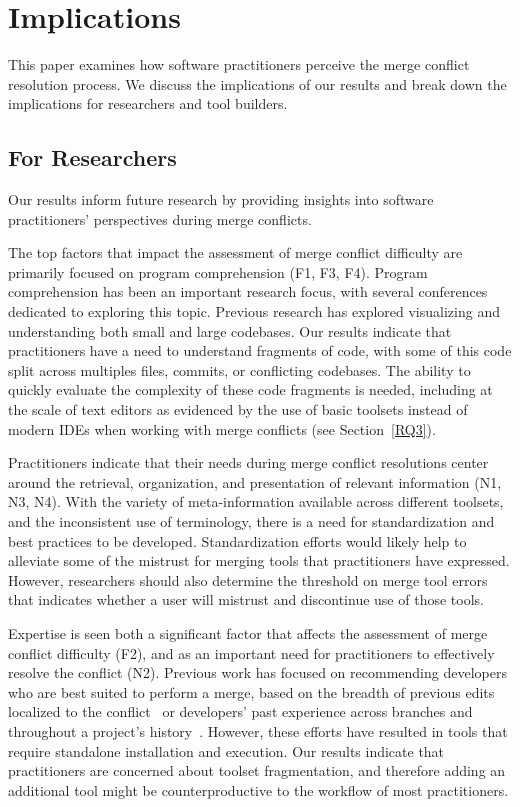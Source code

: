 \section{Implications}\label{implications}
This paper examines how software practitioners perceive the merge conflict resolution process.
We discuss the implications of our results and break down the implications for researchers and tool builders.

\subsection{For Researchers}
Our results inform future research by providing insights into software practitioners' perspectives during merge conflicts.

The top factors that impact the assessment of merge conflict difficulty are primarily focused on program comprehension (F1, F3, F4).
Program comprehension has been an important research focus, with several conferences dedicated to exploring this topic.
Previous research has explored visualizing and understanding both small and large codebases.
Our results indicate that practitioners have a need to understand fragments of code, with some of this code split across multiples files, commits, or conflicting codebases.
The ability to quickly evaluate the complexity of these code fragments is needed, including at the scale of text editors as evidenced by the use of basic toolsets instead of modern IDEs when working with merge conflicts (see Section~\ref{RQ3}).

Practitioners indicate that their needs during merge conflict resolutions center around the retrieval, organization, and presentation of relevant information (N1, N3, N4).
With the variety of meta-information available across different toolsets, and the inconsistent use of terminology, there is a need for standardization and best practices to be developed.
Standardization efforts would likely help to alleviate some of the mistrust for merging tools that practitioners have expressed.
However, researchers should also determine the threshold on merge tool errors that indicates whether a user will mistrust and discontinue use of those tools.

Expertise is seen both a significant factor that affects the assessment of merge conflict difficulty (F2), and as an important need for practitioners to effectively resolve the conflict (N2).
Previous work has focused on recommending developers who are best suited to perform a merge, based on the breadth of previous edits localized to the conflict~\cite{dasilva2015niche} or developers' past experience across branches and throughout a project's history~\cite{CostaSarma}.
However, these efforts have resulted in tools that require standalone installation and execution.
Our results indicate that practitioners are concerned about toolset fragmentation, and therefore adding an additional tool might be counterproductive to the workflow of most practitioners.

